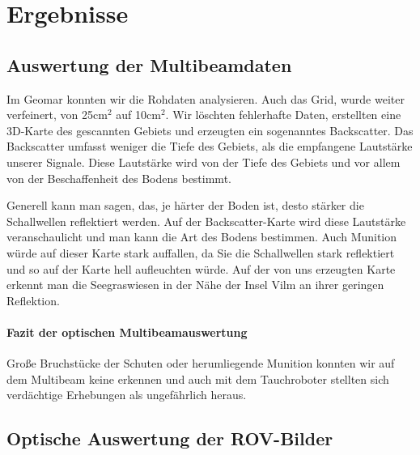  

\chapter{Ergebnisse}

\section{Auswertung der Multibeamdaten}

Im Geomar konnten wir die Rohdaten analysieren. Auch das Grid, wurde weiter verfeinert, von 25cm$^2$ auf 10cm$^2$. 
Wir löschten fehlerhafte Daten, erstellten eine 3D-Karte des gescannten Gebiets und erzeugten ein sogenanntes \glqq Backscatter\grqq . 
Das Backscatter umfasst weniger die Tiefe des Gebiets, als die empfangene Lautstärke unserer Signale. 
Diese Lautstärke wird von der Tiefe des Gebiets und vor allem von der Beschaffenheit des Bodens bestimmt.

Generell kann man sagen, das, je härter der Boden ist, desto stärker die Schallwellen reflektiert werden. 
Auf der Backscatter-Karte wird diese Lautstärke veranschaulicht und man kann die Art des Bodens bestimmen.
Auch Munition würde auf dieser Karte stark auffallen, da Sie die Schallwellen stark reflektiert und so 
auf der Karte hell aufleuchten würde. Auf der von uns erzeugten Karte erkennt man die Seegraswiesen in der Nähe der Insel Vilm an ihrer geringen Reflektion.

\subsubsection{Fazit der optischen Multibeamauswertung}
Große Bruchstücke der Schuten oder herumliegende Munition konnten wir auf dem Multibeam keine erkennen und auch mit dem Tauchroboter stellten sich verdächtige Erhebungen als ungefährlich heraus. \\

\section{Optische Auswertung der ROV-Bilder}
